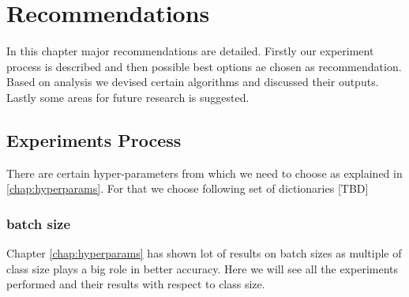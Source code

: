 
\newcommand{\BibTeX}{Bib\TeX}

\chapter{Recommendations}\label{chap:recommendations}

In this chapter major recommendations are detailed. Firstly our experiment process is described and then possible best options ae chosen as recommendation.
Based on analysis we devised certain algorithms and discussed their outputs. Lastly some areas for future research is suggested.

\section{Experiments Process}
There are certain hyper-parameters from which we need to choose as explained in \ref{chap:hyperparams}. For that we choose following set of dictionaries [TBD]



\subsection{batch size}
Chapter \ref{chap:hyperparams} has shown lot of results on batch sizes as multiple of class size plays a big role in better accuracy. Here we will see all the experiments performed and their results with respect to class size.





